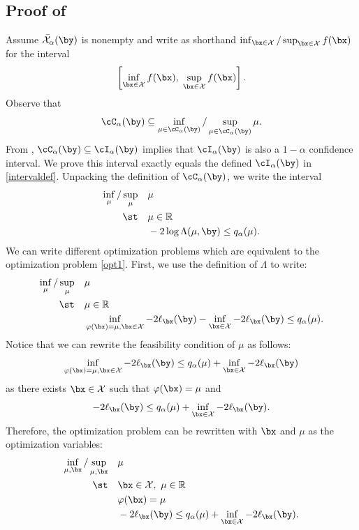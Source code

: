 \documentclass[11pt]{article}
\numberwithin{equation}{section}
\numberwithin{figure}{section}
\begin{document}
\subsection{Proof of }\label{proof:main}
Assume $\bar{\mathcal X}_\alpha(\by)$ is nonempty and write as shorthand $\inf_{\bx \in \mathcal X}/\sup_{\bx \in \mathcal X} f(\bx)$ for the interval
\[
    \left[\inf_{\bx \in \mathcal X} f(\bx), \; \sup_{\bx \in \mathcal X} f(\bx)\right].
\]
Observe that
\begin{equation} 
    \cC_\alpha(\by) \subseteq \inf_{\mu \in \cC_\alpha(\by)}/\sup_{\mu \in \cC_\alpha(\by)} \mu.
\end{equation}
From , $\cC_\alpha(\by) \subseteq \cI_\alpha(\by)$ implies that $\cI_\alpha(\by)$ is also a $1 - \alpha$ confidence interval. 
We prove this interval exactly equals the defined $\cI_\alpha(\by)$ in \eqref{intervaldef}. 
Unpacking the definition of $\cC_\alpha(\by)$, we write the interval
\begin{equation}\label{opt1}
\begin{aligned}
\inf_\mu/\sup_{\mu} \quad & \mu \\
\st \quad & \mu \in \mathbb{R} \\ & -2\log\Lambda(\mu, \by) \leq q_\alpha(\mu).
\end{aligned}
\end{equation}
We can write different optimization problems which are equivalent to the optimization problem \eqref{opt1}. 
First, we use the definition of $\Lambda$ to write:
\begin{equation}
\label{opt2}
\begin{aligned}
\inf_\mu/\sup_{\mu} \quad & \mu \\
\st \quad & \mu \in \mathbb{R} \\ & \inf_{\varphi(\bx) = \mu, \bx \in \mathcal X} -2\ell_{\bx}(\by) - \inf_{\bx \in \mathcal X} -2\ell_{\bx}(\by)\leq q_\alpha(\mu) .
\end{aligned}
\end{equation}
Notice that we can rewrite the feasibility condition of $\mu$ as follows:
\[
\inf_{\varphi(\bx) = \mu, \bx \in \mathcal X} -2\ell_{\bx}(\by)\leq q_\alpha(\mu) + \inf_{\bx \in \mathcal X} -2\ell_{\bx}(\by)
\]
as there exists $\bx \in \mathcal X$ such that $\varphi(\bx) = \mu$ and 
\[
-2\ell_{\bx}(\by) \leq q_\alpha(\mu) + \inf_{\bx \in \mathcal X} -2\ell_{\bx}(\by).
\]
Therefore, the optimization problem can be rewritten with $\bx$ and $\mu$ as the optimization variables:
\begin{equation}
\label{opt3}
\begin{aligned}
\inf_{\mu, \bx}/\sup_{\mu, \bx} \quad & \mu \\
    \st \quad & \bx \in \mathcal X,~ \mu \in \mathbb{R} \\
& \varphi(\bx) = \mu \\
& -2\ell_{\bx}(\by) \leq q_\alpha(\mu) + \inf_{\bx \in \mathcal X} -2\ell_{\bx}(\by).
\end{aligned}
\end{equation}
\end{document}
